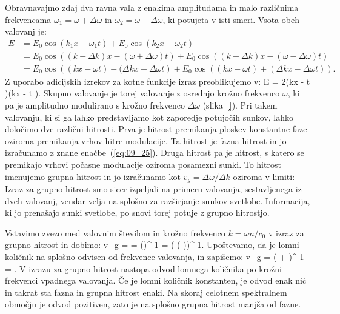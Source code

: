 Obravnavajmo zdaj dva ravna vala z enakima amplitudama in malo različnima 
frekvencama $\omega_1=\omega + \Delta \omega$ in $\omega_2=\omega - \Delta \omega$, 
ki potujeta v isti smeri. Vsota obeh valovanj je:
\begin{align}
E &= E_0 \cos (k_1x-\omega_1 t)+ E_0 \cos (k_2x-\omega_2 t) \nonumber\\
&= E_0 \cos\left((k-\Delta k)x-(\omega + \Delta \omega)t\right) 
+ E_0 \cos\left((k+\Delta k)x-(\omega - \Delta \omega)t\right)\nonumber \\
&= E_0 \cos\left((kx - \omega t) -(\Delta k x-\Delta \omega t\right)
+ E_0 \cos\left((k x - \omega t) + (\Delta k x- \Delta \omega t)  \right)\!. 
\label{eq:09_23}
\end{align}
Z uporabo adicijskih izrekov za kotne funkcije izraz preoblikujemo v:
\beq
E = 2\cos \left(kx - \omega t \right)\cos \left(\Delta kx - \Delta \omega t \right)\!.
\label{eq:09_24}
\eeq
Skupno valovanje je torej valovanje z osrednjo krožno frekvenco $\omega$, 
ki pa je amplitudno modulirano s krožno frekvenco $\Delta \omega$ (slika~\ref{}).
Pri takem valovanju, ki si ga lahko predstavljamo kot zaporedje potujočih sunkov,
lahko določimo dve različni hitrosti. Prva je hitrost premikanja ploskev konstantne
faze oziroma premikanja vrhov hitre modulacije. Ta hitrost je fazna hitrost in
jo izračunamo z znane enačbe~(\ref{eq:09_25}). Druga hitrost pa je hitrost, s katero
se premikajo vrhovi počasne modulacije oziroma posamezni sunki. To hitrost imenujemo
grupna hitrost in jo izračunamo kot $v_g=\Delta \omega/\Delta k$ oziroma v limiti:
Izraz za grupno hitrost smo sicer izpeljali na primeru valovanja, sestavljenega iz dveh
valovanj, vendar velja na splošno za razširjanje sunkov svetlobe. Informacija,
ki jo prenašajo sunki svetlobe, po snovi torej potuje z grupno hitrostjo.

Vstavimo zvezo med valovnim številom in krožno frekvenco $k=\omega n /c_0$ v izraz za 
grupno hitrost in dobimo:
\beq
v_g =  = \left(\right)^{-1} = \left( \left( 
\right)\!\right)^{-1}\!\!.
\label{eq:09_25}
\eeq
Upoštevamo, da je lomni količnik na splošno odvisen od frekvence valovanja, in zapišemo:
\beq
v_g = \left( + \right)^{-1} = 
.
\label{eq:09_26}
\eeq
V izrazu za grupno hitrost nastopa odvod lomnega količnika po krožni frekvenci vpadnega
valovanja. Če je lomni količnik konstanten, je odvod enak nič in takrat sta fazna in grupna 
hitrost enaki. Na skoraj celotnem spektralnem območju je odvod pozitiven, zato je na splošno
grupna hitrost manjša od fazne.

